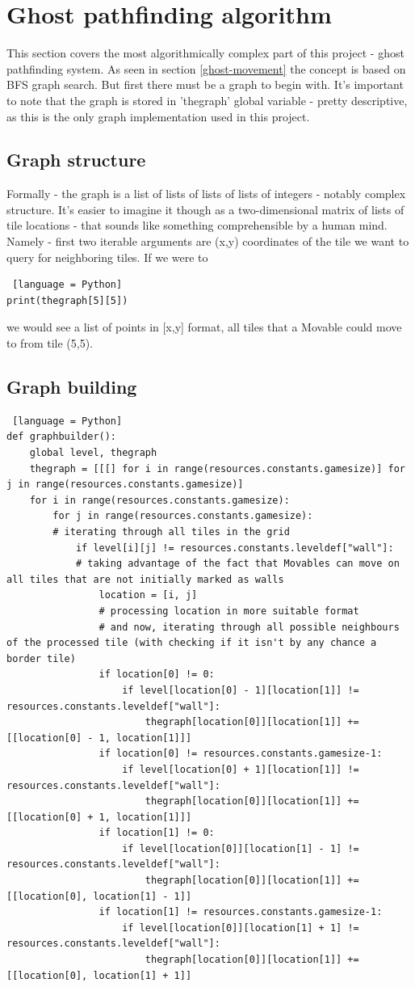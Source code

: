\documentclass[11pt,a4paper,notitlepage]{report}
\newcommand{\dsubsection}[1]{\FloatBarrier \subsection{#1}}
\begin{document}
		\section{Ghost pathfinding algorithm}
			This section covers the most algorithmically complex part of this project - ghost pathfinding system. As seen in section \ref{ghost-movement} the concept is based on BFS graph search. But first there must be a graph to begin with. It's important to note that the graph is stored in 'thegraph' global variable - pretty descriptive, as this is the only graph implementation used in this project.
			\dsubsection{Graph structure}
				Formally - the graph is a list of lists of lists of lists of integers - notably complex structure. It's easier to imagine it though as a two-dimensional matrix of lists of tile locations - that sounds like something comprehensible by a human mind. Namely - first two iterable arguments are (x,y) coordinates of the tile we want to query for neighboring tiles. If we were to
				\begin{lstlisting} [language = Python]
print(thegraph[5][5])
				\end{lstlisting}
				we would see a list of points in [x,y] format, all tiles that a Movable could move to from tile (5,5).
			\dsubsection{Graph building}
				\begin{lstlisting} [language = Python]
def graphbuilder():
	global level, thegraph
	thegraph = [[[] for i in range(resources.constants.gamesize)] for j in range(resources.constants.gamesize)]
	for i in range(resources.constants.gamesize):
		for j in range(resources.constants.gamesize):
		# iterating through all tiles in the grid
			if level[i][j] != resources.constants.leveldef["wall"]:
			# taking advantage of the fact that Movables can move on all tiles that are not initially marked as walls
				location = [i, j]
				# processing location in more suitable format
				# and now, iterating through all possible neighbours of the processed tile (with checking if it isn't by any chance a border tile)
				if location[0] != 0:
					if level[location[0] - 1][location[1]] != resources.constants.leveldef["wall"]:
						thegraph[location[0]][location[1]] += [[location[0] - 1, location[1]]]
				if location[0] != resources.constants.gamesize-1:
					if level[location[0] + 1][location[1]] != resources.constants.leveldef["wall"]:
						thegraph[location[0]][location[1]] += [[location[0] + 1, location[1]]]
				if location[1] != 0:
					if level[location[0]][location[1] - 1] != resources.constants.leveldef["wall"]:
						thegraph[location[0]][location[1]] += [[location[0], location[1] - 1]]
				if location[1] != resources.constants.gamesize-1:
					if level[location[0]][location[1] + 1] != resources.constants.leveldef["wall"]:
						thegraph[location[0]][location[1]] += [[location[0], location[1] + 1]]
				\end{lstlisting}
\end{document}

